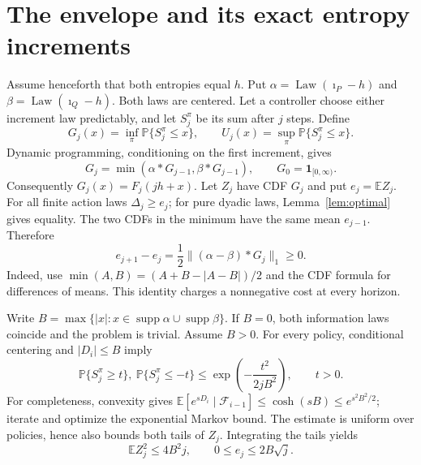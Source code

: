 \documentclass[11pt,a4paper]{article}
\newcommand{\E}{\mathbb E}
\newcommand{\Prb}{\mathbb P}
\newcommand{\Law}{\operatorname{Law}}
\newcommand{\ii}{\imath}
\begin{document}
\section{The envelope and its exact entropy increments}
Assume henceforth that both entropies equal $h$. Put
$\alpha=\Law(\ii_P-h)$ and $\beta=\Law(\ii_Q-h)$.
Both laws are centered. Let a controller choose either increment law
predictably, and let $S_j^\pi$ be its sum after $j$ steps. Define
\[
G_j(x)=\inf_\pi\Prb\{S_j^\pi\le x\},\qquad
U_j(x)=\sup_\pi\Prb\{S_j^\pi\le x\}.
\]
Dynamic programming, conditioning on the first increment, gives
\[
G_j=\min(\alpha*G_{j-1},\beta*G_{j-1}),\qquad
G_0=\mathbf1_{[0,\infty)}.
\]
Consequently $G_j(x)=F_j(jh+x)$.
Let $Z_j$ have CDF $G_j$ and put $e_j=\E Z_j$.
For all finite action laws $\Delta_j\ge e_j$; for pure dyadic laws,
Lemma~\ref{lem:optimal} gives equality.
The two CDFs in the minimum have the same mean $e_{j-1}$. Therefore
\begin{equation}\label{eq:increments}
e_{j+1}-e_j=\frac12\| (\alpha-\beta)*G_j\|_1\ge0.
\end{equation}
Indeed, use $\min(A,B)=(A+B-|A-B|)/2$ and the CDF formula for differences
of means. This identity charges a nonnegative cost at every horizon.

Write $B=\max\{|x|:x\in\operatorname{supp}\alpha\cup
\operatorname{supp}\beta\}$. If $B=0$, both information laws coincide
and the problem is trivial. Assume $B>0$. For every policy, conditional
centering and $|D_i|\le B$ imply
\[
\Prb\{S_j^\pi\ge t\},\ \Prb\{S_j^\pi\le-t\}
\le\exp\left(-\frac{t^2}{2jB^2}\right),\qquad t>0.
\]
For completeness, convexity gives
$\E[e^{sD_i}\mid\mathcal F_{i-1}]\le\cosh(sB)\le e^{s^2B^2/2}$;
iterate and optimize the exponential Markov bound.
The estimate is uniform over policies, hence also bounds both tails of
$Z_j$. Integrating the tails yields
\begin{equation}\label{eq:second}
\E Z_j^2\le4B^2j,\qquad 0\le e_j\le2B\sqrt j.
\end{equation}
\end{document}
